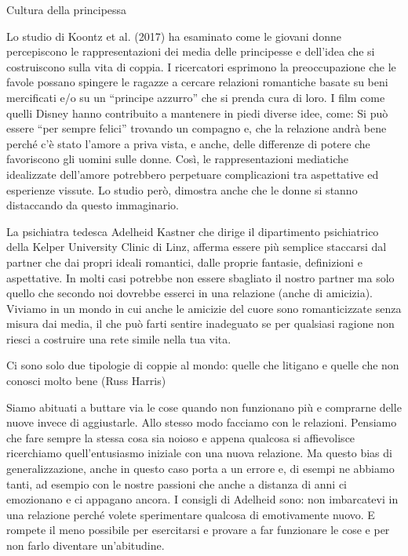 \documentclass[12pt]{book} %
\begin{document}
\begin{mdframed}[linewidth=1pt]
Cultura della principessa

Lo studio di Koontz et al. (2017) ha esaminato
come le giovani donne percepiscono le rappresentazioni dei media delle principesse e dell'idea che
si costruiscono sulla vita di coppia. I ricercatori esprimono la preoccupazione che le favole possano spingere le
ragazze a cercare relazioni romantiche basate su beni mercificati e/o su un “principe azzurro” che si prenda cura di
loro. I film come quelli Disney hanno contribuito a mantenere in piedi diverse idee, come: Si può essere “per sempre
felici” trovando un compagno e, che la relazione andrà bene perché c'è stato
l'amore a priva vista, e anche, delle differenze di potere che favoriscono gli uomini sulle donne.
Così, le rappresentazioni mediatiche idealizzate dell'amore potrebbero perpetuare complicazioni
tra aspettative ed esperienze vissute. Lo studio però, dimostra anche che le donne si stanno distaccando da questo
immaginario.
\end{mdframed}

La psichiatra tedesca Adelheid Kastner che dirige il dipartimento psichiatrico della Kelper University Clinic di Linz,
afferma essere più semplice staccarsi dal partner che dai propri ideali romantici, dalle proprie fantasie, definizioni
e aspettative. In molti casi potrebbe non essere sbagliato il nostro partner ma solo quello che secondo noi dovrebbe
esserci in una relazione (anche di amicizia). Viviamo in un mondo in cui anche le
amicizie del cuore sono romanticizzate senza misura dai media, il che può farti sentire inadeguato se per qualsiasi
ragione non riesci a costruire una rete simile nella tua vita. 

Ci sono solo due tipologie di coppie al mondo: quelle che litigano e quelle che non conosci molto bene (Russ Harris)

Siamo abituati a buttare via le cose quando non funzionano più e comprarne delle nuove invece di aggiustarle. Allo
stesso modo facciamo con le relazioni. Pensiamo che fare sempre la stessa cosa sia noioso e appena qualcosa si
affievolisce ricerchiamo quell'entusiasmo iniziale con una nuova relazione. Ma questo bias di
generalizzazione, anche in questo caso porta a un errore e, di esempi ne abbiamo tanti, ad esempio con le nostre
passioni che anche a distanza di anni ci emozionano e ci appagano ancora. I consigli di Adelheid sono: non imbarcatevi
in una relazione perché volete sperimentare qualcosa di emotivamente nuovo. E rompete il meno possibile per esercitarsi
e provare a far funzionare le cose e per non farlo diventare
un'abitudine.
\end{document}
